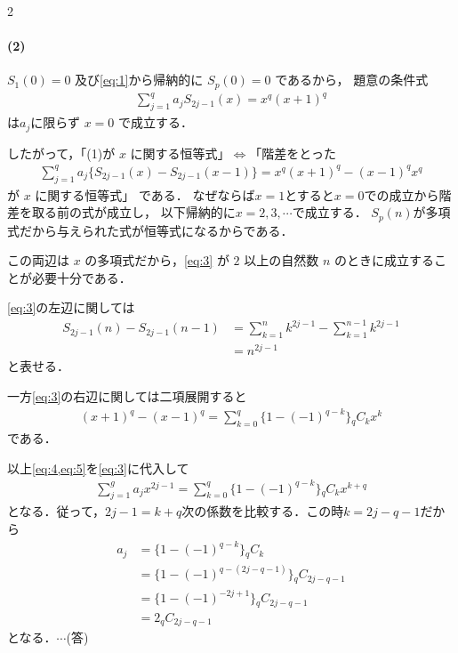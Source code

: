 \documentclass[../../main.tex]{subfiles}
\begin{document}
\begin{multicols}{2}
  \paragraph{(2)}
  $S_1(0)=0$ 及び\cref{eq:1}から帰納的に $S_{p}(0)=0$ であるから，
  題意の条件式
  \begin{align}
    \sum_{j=1}^{q} a_{j} S_{2j-1}(x) = x^{q}(x+1)^{q} \label{eq:2}
  \end{align}
  は$a_{j}$に限らず $x=0$ で成立する．

  したがって，「(1)が $x$ に関する恒等式」$\Leftrightarrow$「階差をとった
  \begin{align}
    \sum_{j=1}^{q} a_{j} \{ S_{2j-1}(x) - S_{2j-1}(x-1) \} = x^{q}(x+1)^{q} - (x-1)^{q}x^{q} \label{eq:3}
  \end{align}
  が $x$ に関する恒等式」
  である．
  なぜならば$x=1$とすると$x=0$での成立から階差を取る前の式が成立し，
  以下帰納的に$x=2,3,\cdots$で成立する．
  $S_{p}(n)$が多項式だから与えられた式が恒等式になるからである．

  この両辺は $x$ の多項式だから，\cref{eq:3} が $2$ 以上の自然数 $n$ のときに成立することが必要十分である．

  \cref{eq:3}の左辺に関しては
  \begin{align}
    S_{2j-1}(n) - S_{2j-1}(n-1)
    & = \sum_{k=1}^{n}k^{2j-1} - \sum_{k=1}^{n-1}k^{2j-1} \\
    & = n^{2j-1} \label{eq:4}
  \end{align}
  と表せる．

  一方\cref{eq:3}の右辺に関しては二項展開すると
  \begin{align}
    (x+1)^{q} - (x-1)^{q} = \sum_{k=0}^{q} \{ 1 - (-1)^{q-k} \} {}_{q}C_{k} x^{k} \label{eq:5}
  \end{align}
  である．

  以上\cref{eq:4,eq:5}を\cref{eq:3}に代入して
  \begin{align}
    \sum_{j=1}^{g} a_{j} x^{2j-1} = \sum_{k=0}^{q} \{ 1 - (-1)^{q-k} \} {}_{q}C_{k} x^{k+q}
  \end{align}
  となる．従って，$2j-1=k+q$次の係数を比較する．この時$k=2j-q-1$だから
  \begin{align}
    a_{j}
    & = \{ 1 - (-1)^{q-k} \} {}_{q}C_{k}             \\
    & = \{ 1 - (-1)^{q-(2j-q-1)} \} {}_{q}C_{2j-q-1} \\
    & = \{ 1 - (-1)^{-2j+1} \} {}_{q}C_{2j-q-1}     \\
    & = 2{}_{q}C_{2j-q-1}
  \end{align}
  となる．$\cdots$(答)


\end{multicols}
\end{document}
